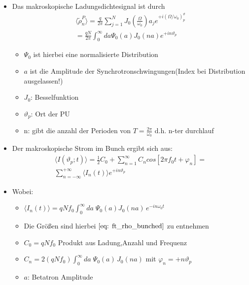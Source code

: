 \documentclass[12pt]{article}%
\renewcommand{\phi}{\varphi}
\renewcommand{\theta}{\vartheta}
\begin{document}
\begin{itemize}
	\item Das makroskopische Ladungsdichtesignal ist durch 
	\begin{align}
		\langle  \tilde{\rho}^P_n \rangle = \frac{q}{2 \pi} \sum_{j=1}^{N} J_0(\frac{\Omega}{\omega_0})a_je^{+i(\Omega/\omega_0)^\theta_p} \\
		= \frac{qN}{2\pi}\int_{0}^{\infty} da \Psi_0(a)J_0(na)e^{+in\theta_p}
	\end{align}
	\begin{itemize}
		\item $\Psi_0$ ist hierbei eine normalisierte Distribution
		\item$a$ ist die Amplitude der Synchrotronschwingungen(Index bei Distribution ausgelassen!)
		\item $J_0$: Besselfunktion
		\item $\theta_p$: Ort der PU 
		\item n: gibt die  anzahl der Perioden von $T=\frac{2\pi}{\omega_0}$ d.h. n-ter durchlauf
		
	\end{itemize}
\end{itemize}

\begin{itemize}
	 \item Der makroskopische Strom im Bunch ergibt sich aus: 
	 \begin{align}
	 	\label{eq:makr_strom_bunch}
	 	\langle I(\theta_p;t) \rangle= \frac{1}{2}C_0+\sum_{n=1}^{\infty}C_n cos[2\pi f_0 t + \phi_n]= \\ \sum_{n=-\infty}^{+\infty} \langle  I_n(t)\rangle e^{+in\theta_p}
	 \end{align}
	 \item Wobei:
	 \begin{itemize}
	 	\item $\langle I_n(t)\rangle =  qNf_0 \int_{0}^{\infty}da\; \Psi_0(a)J_0(na)\, e^{-in\omega_0t}$\\
	 	\item Die Größen sind hierbei $\eqref{eq: ft_rho_bunched}$ zu entnehmen
		\item $C_0 = qNf_0$ Produkt aus Ladung,Anzahl und Frequenz
		\item $C_n = 2(qNf_0)\int_{0}^{\infty}da \; \Psi_0(a)\, J_0(na)$ mit $\phi_n = +n\theta_p$
		\item $a$: Betatron Amplitude
		
	 \end{itemize}
\end{itemize}
\end{document}
